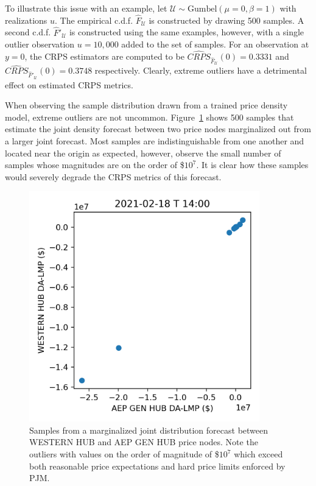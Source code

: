 To illustrate this issue with an example, let $\mathcal{U} \sim \text{Gumbel}(\mu=0, \beta=1)$ with realizations $u$.
The empirical c.d.f. $\hat{F}_\mathcal{U}$ is constructed by drawing 500 samples.
A second c.d.f. $\hat{F}'_\mathcal{U}$ is constructed using the same examples, however, with a single outlier observation
$u=10,000$ added to the set of samples.
For an observation at $y=0$, the CRPS estimators are computed to be $\widehat{CRPS}_{\hat{F}_\mathcal{U}}(0) = 0.3331$
and $\widehat{CRPS}_{\hat{F}'_\mathcal{U}}(0) = 0.3748$ respectively.
Clearly, extreme outliers have a detrimental effect on estimated CRPS metrics.

When observing the sample distribution drawn from a trained price density model, extreme outliers are not uncommon.
Figure~\ref{fig:badsamples} shows 500 samples that estimate the joint density forecast between two price nodes
marginalized out from a larger joint forecast.
Most samples are indistinguishable from one another and located near the origin as expected, however,
observe the small number of samples whose magnitudes are on the order of \$$10^7$.
It is clear how these samples would severely degrade the CRPS metrics of this forecast.

\begin{figure}[htbp]
    \caption[Samples drawn joint density forecast with extreme outliers]{
        Samples from a marginalized joint distribution forecast between WESTERN HUB and AEP GEN HUB price nodes.
        Note the outliers with values on the order of magnitude of \$$10^7$ which exceed both
        reasonable price expectations and hard price limits enforced by PJM.
    }
    \begin{center}
        \setlength{\fboxsep}{0pt}%
        \setlength{\fboxrule}{1pt}%
        \includegraphics[width=100mm]{figs/bad_samples}
    \end{center}
    \label{fig:badsamples}
\end{figure}

